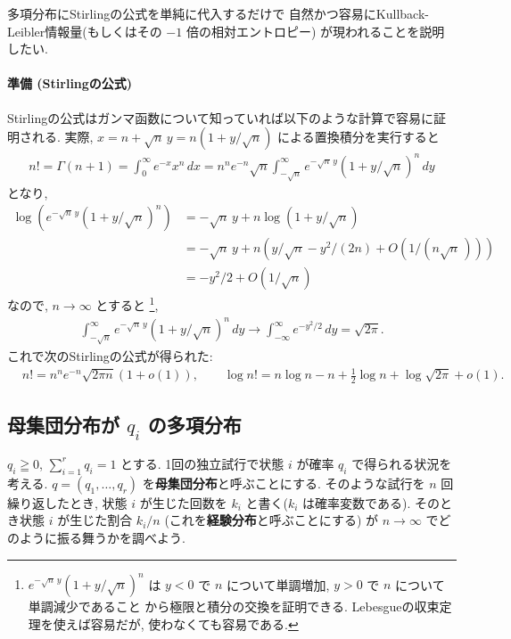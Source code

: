 \documentclass[12pt,twoside]{jarticle}
\theoremstyle{jplain}
\theoremstyle{jplain}
\theoremstyle{jplain}
\numberwithin{theorem}{section}
\numberwithin{equation}{section}
\numberwithin{figure}{section}
\numberwithin{table}{section}
\begin{document}
多項分布にStirlingの公式を単純に代入するだけで
自然かつ容易にKullback-Leibler情報量(もしくはその $-1$ 倍の相対エントロピー)
が現われることを説明したい.

\paragraph{準備 (Stirlingの公式)}
Stirlingの公式はガンマ函数について知っていれば以下のような計算で容易に証明される.
実際, $x=n+\sqrt{n}\,y=n(1+y/\sqrt{n})$ による置換積分を実行すると
\begin{align*}
n!=\Gamma(n+1)=\int_0^\infty e^{-x}x^n\,dx
=n^n e^{-n}\sqrt{n}\int_{-\sqrt{n}}^\infty e^{-\sqrt{n}\,y}(1+y/\sqrt{n})^n\,dy
\end{align*}
となり, 
\begin{align*}
\log(e^{-\sqrt{n}\,y}(1+y/\sqrt{n})^n)
&
=-\sqrt{n}\,y+n\log(1+y/\sqrt{n})
\\ &
=-\sqrt{n}\,y+n\left(y/\sqrt{n}-y^2/(2n)+O\left(1/(n\sqrt{n}\,)\right)\right)
\\ &
= -y^2/2 + O\left(1/\sqrt{n}\right)
\end{align*}
なので, $n\to\infty$ とすると%
\footnote{$e^{-\sqrt{n}\,y}(1+y/\sqrt{n})^n$ は 
$y<0$ で $n$ について単調増加, $y>0$ で $n$ について単調減少であること
から極限と積分の交換を証明できる. Lebesgueの収束定理を使えば容易だが, 
使わなくても容易である.}, 
\begin{align*}
\int_{-\sqrt{n}}^\infty e^{-\sqrt{n}\,y}(1+y/\sqrt{n})^n\,dy
\longrightarrow
\int_{-\infty}^\infty e^{-y^2/2}\,dy = \sqrt{2\pi}.
\end{align*}
これで次のStirlingの公式が得られた:
\begin{align*}
&
n! = n^n e^{-n}\sqrt{2\pi n}(1+o(1)),
\qquad
\log n! = n \log n - n +\frac{1}{2}\log n + \log\sqrt{2\pi} + o(1).
\end{align*}


\subsection{母集団分布が $q_i$ の多項分布}

$q_i\geqq 0$, $\sum_{i=1}^r q_i=1$ とする.
1回の独立試行で状態 $i$ が確率 $q_i$ で得られる状況を考える.
$q=(q_1,\ldots,q_r)$ を{\bf 母集団分布}と呼ぶことにする.
そのような試行を $n$ 回繰り返したとき, 
状態 $i$ が生じた回数を $k_i$ と書く($k_i$ は確率変数である).
そのとき状態 $i$ が生じた割合 $k_i/n$ (これを{\bf 経験分布}と呼ぶことにする)
が $n\to\infty$ でどのように振る舞うかを調べよう.
\end{document}
